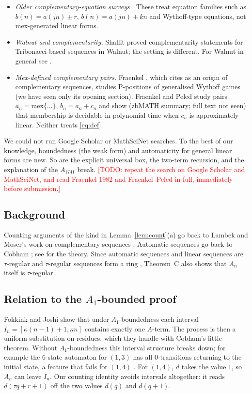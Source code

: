 \documentclass[11pt]{amsart}
\theoremstyle{definition}
\theoremstyle{remark}
\newcommand{\todo}[1]{\textcolor{red}{[TODO: #1]}}
\begin{document}
\begin{itemize}
\item \emph{Older complementary-equation surveys} \cite{Kim07,Kim08}. These treat equation families such as $b(n)=a(jn)\pm r$, $b(n)=a(jn)+kn$ and Wythoff-type equations, not mex-generated linear forms.
\item \emph{Walnut and complementarity.} Shallit \cite{ShallitTrib} proved complementarity statements for Tribonacci-based sequences in Walnut; the setting is different. For Walnut in general see \cite{ShallitBook,Mousavi}.
\item \emph{Mex-defined complementary pairs.} Fraenkel \cite{Fraenkel82}, which \cite{FJ} cites as an origin of complementary sequences, studies P-positions of generalised Wythoff games (we have seen only its opening section). Fraenkel and Peled \cite{FraenkelPeled} study pairs $a_n=\mathrm{mex}\{\dots\}$, $b_n=a_n+c_n$ and show (zbMATH summary; full text not seen) that membership is decidable in polynomial time when $c_n$ is approximately linear. Neither treats \eqref{eq:def}.
\end{itemize}
We could not run Google Scholar or MathSciNet searches. To the best of our knowledge, boundedness (the weak form) and automaticity for general linear forms are new. So are the explicit universal box, the two-term recursion, and the explanation of the $A_{1741}$ break. \todo{repeat the search on Google Scholar and MathSciNet, and read Fraenkel 1982 and Fraenkel--Peled in full, immediately before submission.}

\subsection*{Background}
Counting arguments of the kind in Lemma~\ref{lem:count}(a) go back to Lambek and Moser's work on complementary sequences \cite{LambekMoser}. Automatic sequences go back to Cobham \cite{Cobham}; see \cite{AS} for the theory. Since automatic sequences and linear sequences are $\tau$-regular and $\tau$-regular sequences form a ring \cite{AS92}, Theorem~C also shows that $A_n$ itself is $\tau$-regular.

\subsection*{Relation to the $A_1$-bounded proof}
Fokkink and Joshi show that under $A_1$-boundedness each interval $I_n=[\kappa(n-1)+1,\kappa n]$ contains exactly one $A$-term. The process is then a uniform substitution on residues, which they handle with Cobham's little theorem. Without $A_1$-boundedness this interval structure breaks down; for example the $6$-state automaton for $(1,3)$ \cite[Fig.~7]{FJ} has all $0$-transitions returning to the initial state, a feature that fails for $(1,4)$ \cite[\S5]{FJ}. For $(1,4)$, $d$ takes the value $1$, so $A_n$ can leave $I_n$. Our counting identity avoids intervals altogether: it reads $d(\tau q+r+1)$ off the two values $d(q)$ and $d(q+1)$.
\end{document}
